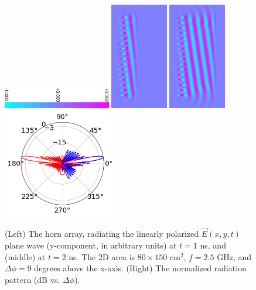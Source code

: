 \documentclass[11pt]{amsart}
\begin{document}
\begin{figure}
\centering
\includegraphics[width=4.7cm,angle=90]{figures/fields/colorbar.pdf}
\includegraphics[width=2.5cm]{figures/fields/ey_phase_horn_t30.png}
\includegraphics[width=2.5cm]{figures/fields/ey_phase_horn_t60.png}
\includegraphics[width=5cm]{figures/fields/rad_patt_field.png}
\caption{\label{fig:1dhornresults2} (Left) The horn array, radiating the linearly polarized $\vec{E}(x,y,t)$ plane wave (y-component, in arbitrary units) at $t = 1$ ns, and (middle) at $t = 2$ ns.  The 2D area is $80 \times 150$ cm$^2$, $f=2.5$ GHz, and $\Delta \phi = 9$ degrees above the x-axis. (Right) The normalized radiation pattern (dB vs. $\Delta \phi$).}
\end{figure}
\end{document}

